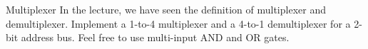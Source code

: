\begin{task}{Multiplexer}{}{}
  In the lecture, we have seen the definition of multiplexer and demultiplexer. Implement
  a 1-to-4 multiplexer and a 4-to-1 demultiplexer for a 2-bit address bus. 
  Feel free to use multi-input AND and OR gates.
\end{task}
